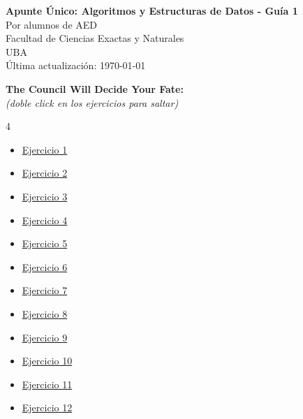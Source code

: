 



\begin{center}
    \Huge \textbf{Apunte Único: Algoritmos y Estructuras de Datos - Guía 1} \\
    \vspace{0.5cm}
    \Large Por alumnos de AED \\
    \normalsize Facultad de Ciencias Exactas y Naturales \\
    UBA \\
    \vspace{0.3cm}
    \small Última actualización: \today
\end{center}
\vspace{1cm}

\hypertarget{indice}{}
\noindent\textbf{\Large The Council Will Decide Your Fate:} \\
\textit{(doble click en los ejercicios para saltar)}

\begin{multicols}{4}
\begin{itemize}
    \item \hyperlink{ej1}{Ejercicio 1}
    \item \hyperlink{ej2}{Ejercicio 2}
    \item \hyperlink{ej3}{Ejercicio 3}
    \item \hyperlink{ej4}{Ejercicio 4}
    \item \hyperlink{ej5}{Ejercicio 5}
    \item \hyperlink{ej6}{Ejercicio 6}
    \item \hyperlink{ej7}{Ejercicio 7}
    \item \hyperlink{ej8}{Ejercicio 8}
    \item \hyperlink{ej9}{Ejercicio 9}
    \item \hyperlink{ej10}{Ejercicio 10}
    \item \hyperlink{ej11}{Ejercicio 11}
    \item \hyperlink{ej12}{Ejercicio 12}
\end{itemize}
\end{multicols}

\vspace{0.5cm}


